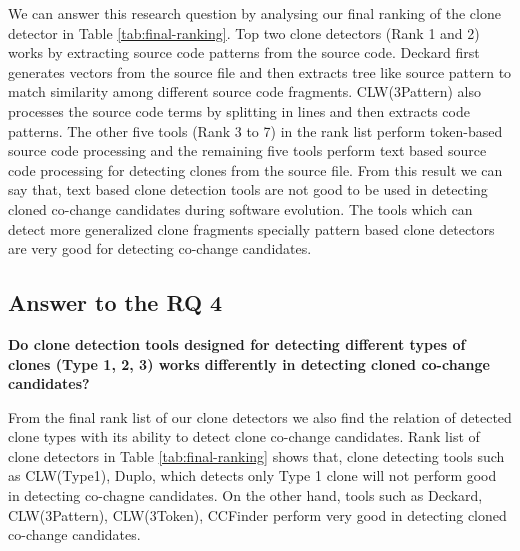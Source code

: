 \documentclass[review]{elsarticle}
\begin{document}
We can answer this research question by analysing our final ranking of the clone detector in Table \ref{tab:final-ranking}. Top two clone detectors (Rank 1 and 2) works by extracting source code patterns from the source code. Deckard first generates vectors from the source file and then extracts tree like source pattern to match similarity among different source code fragments. CLW(3Pattern) also processes the source code terms by splitting in lines and then extracts code patterns. The other five tools (Rank 3 to 7) in the rank list perform token-based source code processing and the remaining five tools perform text based source code processing for detecting clones from the source file. From this result we can say that, text based clone detection tools are not good to be used in detecting cloned co-change candidates during software evolution. The tools which can detect more generalized clone fragments specially pattern based clone detectors are very good for detecting co-change candidates. 

\subsection{Answer to the \textbf{RQ 4}}
\textbf{Do clone detection tools designed for detecting different types of clones (Type 1, 2, 3) works differently in detecting cloned co-change candidates?}

From the final rank list of our clone detectors we also find the relation of detected clone types with its ability to detect clone co-change candidates. Rank list of clone detectors in Table \ref{tab:final-ranking} shows that, clone detecting tools such as CLW(Type1), Duplo, which detects only Type 1 clone will not perform good in detecting co-chagne candidates. On the other hand, tools such as Deckard, CLW(3Pattern), CLW(3Token), CCFinder perform very good in detecting cloned co-change candidates. 
\end{document}
